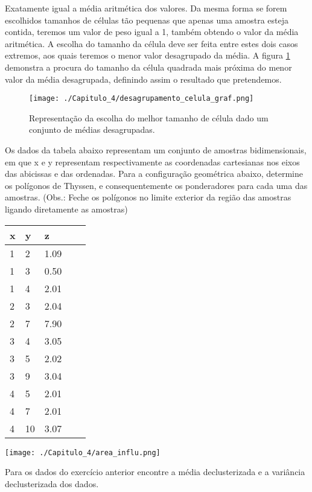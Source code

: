 Exatamente igual a média aritmética dos valores. Da mesma forma se forem escolhidos tamanhos de células tão pequenas que apenas uma amostra esteja contida, teremos um valor de peso igual a 1, também obtendo o valor da média aritmética. A escolha do tamanho da célula deve ser feita entre estes dois casos extremos, aos quais teremos o menor valor desagrupado da média.
 A figura \ref{cel_declus_graf} demonstra a procura do tamanho da célula quadrada mais próxima do menor valor da média desagrupada, definindo assim o resultado que pretendemos. 

\FloatBarrier
\begin{figure}[!htpb]
	\centering
	\texttt{[image: ./Capitulo\_4/desagrupamento\_celula\_graf.png]}	
	\caption{Representação da escolha do melhor tamanho de célula dado um conjunto de médias desagrupadas.}
	\label{cel_declus_graf}
\end{figure}
\FloatBarrier 


\begin{exercise}
	Os dados da tabela abaixo representam um conjunto de amostras bidimensionais, em que x e y representam respectivamente as coordenadas cartesianas nos eixos das abicissas e das ordenadas. Para a configuração geométrica abaixo, determine os polígonos de Thyssen, e consequentemente os ponderadores para cada uma das amostras. (Obs.: Feche os polígonos no limite exterior da região das amostras ligando diretamente as amostras) 
	
	\centering
	\begin{tabular}{lllll}
		\hline
		x & y  & z    &  &  \\ \hline
		1 & 2  & 1.09 &  &  \\
		1 & 3  & 0.50 &  &  \\
		1 & 4  & 2.01 &  &  \\
		2 & 3  & 2.04 &  &  \\
		2 & 7  & 7.90 &  &  \\
		3 & 4  & 3.05 &  &  \\
		3 & 5  & 2.02 &  &  \\
		3 & 9  & 3.04 &  &  \\
		4 & 5  & 2.01 &  &  \\
		4 & 7  & 2.01 &  &  \\
		4 & 10 & 3.07 &  &  \\ \hline
	\end{tabular}


\vspace{50px}
\centering
\texttt{[image: ./Capitulo\_4/area\_influ.png]}	

\end{exercise} 

\begin{exercise}
	Para os dados do exercício anterior encontre a média declusterizada e a variância declusterizada dos dados. 
\end{exercise}